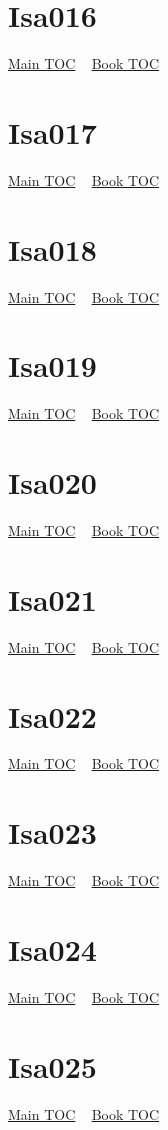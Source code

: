 \documentclass{book}
\begin{document}
  \section{Isa016}\hyperlink{toc}{Main TOC} ~ \hyperref[subsec:Isa]{Book TOC} 
  \section{Isa017}\hyperlink{toc}{Main TOC} ~ \hyperref[subsec:Isa]{Book TOC} 
  \section{Isa018}\hyperlink{toc}{Main TOC} ~ \hyperref[subsec:Isa]{Book TOC} 
  \section{Isa019}\hyperlink{toc}{Main TOC} ~ \hyperref[subsec:Isa]{Book TOC} 
  \section{Isa020}\hyperlink{toc}{Main TOC} ~ \hyperref[subsec:Isa]{Book TOC} 
  \section{Isa021}\hyperlink{toc}{Main TOC} ~ \hyperref[subsec:Isa]{Book TOC} 
  \section{Isa022}\hyperlink{toc}{Main TOC} ~ \hyperref[subsec:Isa]{Book TOC} 
  \section{Isa023}\hyperlink{toc}{Main TOC} ~ \hyperref[subsec:Isa]{Book TOC} 
  \section{Isa024}\hyperlink{toc}{Main TOC} ~ \hyperref[subsec:Isa]{Book TOC} 
  \section{Isa025}\hyperlink{toc}{Main TOC} ~ \hyperref[subsec:Isa]{Book TOC} 
\end{document}
